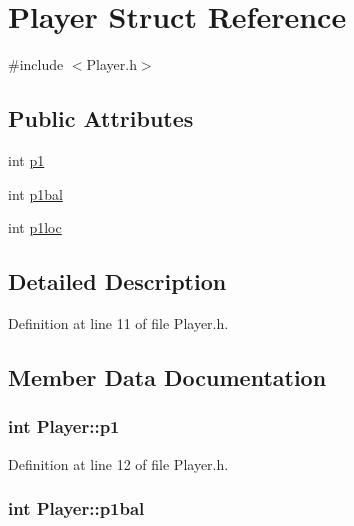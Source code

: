 \hypertarget{struct_player}{}\section{Player Struct Reference}
\label{struct_player}


{\ttfamily \#include $<$Player.\+h$>$}

\subsection*{Public Attributes}
\begin{DoxyCompactItemize}
\item 
int \hyperlink{struct_player_a456981adf4c51f6b561d3cdfdff6f7ad}{p1}
\item 
int \hyperlink{struct_player_a77bbbeac21c695ecffd38681882b9d11}{p1bal}
\item 
int \hyperlink{struct_player_ae52dec091d0be539c78accd4aea23646}{p1loc}
\end{DoxyCompactItemize}


\subsection{Detailed Description}


Definition at line 11 of file Player.\+h.



\subsection{Member Data Documentation}
\hypertarget{struct_player_a456981adf4c51f6b561d3cdfdff6f7ad}{}
\subsubsection[{p1}]{\setlength{\rightskip}{0pt plus 5cm}int Player\+::p1}\label{struct_player_a456981adf4c51f6b561d3cdfdff6f7ad}


Definition at line 12 of file Player.\+h.

\hypertarget{struct_player_a77bbbeac21c695ecffd38681882b9d11}{}
\subsubsection[{p1bal}]{\setlength{\rightskip}{0pt plus 5cm}int Player\+::p1bal}\label{struct_player_a77bbbeac21c695ecffd38681882b9d11}


